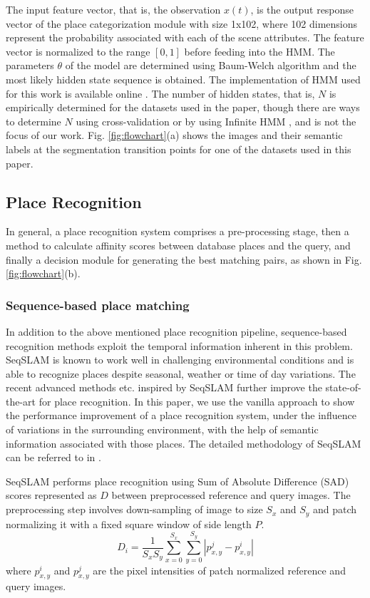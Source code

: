 \documentclass[letterpaper, 10 pt, conference]{ieeeconf}  %
\begin{document}
The input feature vector, that is, the observation $x(t)$, is the output response vector of the place categorization module with size 1x102, where 102 dimensions represent the probability associated with each of the scene attributes. The feature vector is normalized to the range $[0,1]$ before feeding into the HMM. The parameters $\theta$ of the model are determined using Baum-Welch algorithm \cite{baum1966statistical} and the most likely hidden state sequence is obtained. The implementation of HMM used for this work is available online \cite{hmmlearn}. The number of hidden states, that is, $N$ is empirically determined for the datasets used in the paper, though there are ways to determine $N$ using cross-validation \cite{celeux2008selecting} or by using Infinite HMM \cite{beal2002infinite}, and is not the focus of our work. Fig. \ref{fig:flowchart}(a) shows the images and their semantic labels at the segmentation transition points for one of the datasets used in this paper.

\subsection{Place Recognition}
In general, a place recognition system comprises a pre-processing stage, then a method to calculate affinity scores between database places and the query, and finally a decision module for generating the best matching pairs, as shown in Fig. \ref{fig:flowchart}(b).
\subsubsection{Sequence-based place matching}
In addition to the above mentioned place recognition pipeline, sequence-based recognition methods exploit the temporal information inherent in this problem. SeqSLAM \cite{Milford2012} is known to work well in challenging environmental conditions and is able to recognize places despite seasonal, weather or time of day variations. The recent advanced methods \cite{milford2015sequence,wang2015improved} etc. inspired by SeqSLAM further improve the state-of-the-art for place recognition. In this paper, we use the vanilla approach \cite{Milford2012} to show the performance improvement of a place recognition system, under the influence of variations in the surrounding environment, with the help of semantic information associated with those places. The detailed methodology of SeqSLAM can be referred to in \cite{Milford2012}.

SeqSLAM performs place recognition using Sum of Absolute Difference (SAD) scores represented as $D$ between preprocessed reference and query images. The preprocessing step involves down-sampling of image to size $S_x$ and $S_y$ and patch normalizing it with a fixed square window of side length $P$.
\begin{equation}
 D_i = \frac{1}{S_xS_y} \sum\limits_{x=0}^{S_x}\sum\limits_{y=0}^{S_y}|p_{x,y}^j-p_{x,y}^i|
 \label{eq:SADscore}
\end{equation}
where $p_{x,y}^i$ and $p_{x,y}^j$ are the pixel intensities of patch normalized reference and query images.
\end{document}
